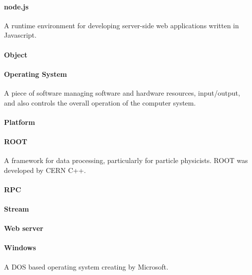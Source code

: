 \paragraph{node.js}
A runtime environment for developing server-side web applications written in Javascript. 

\paragraph{Object}

\paragraph{Operating System}
A piece of software managing software and hardware resources, input/output, and also controls the overall operation of the computer system.
\paragraph{Platform}

\paragraph{ROOT}
A framework for data processing, particularly for particle physicists. ROOT was developed by CERN C++.


\paragraph{RPC}

\paragraph{Stream}

\paragraph{Web server}

\paragraph{Windows}
A DOS based operating system creating by Microsoft.